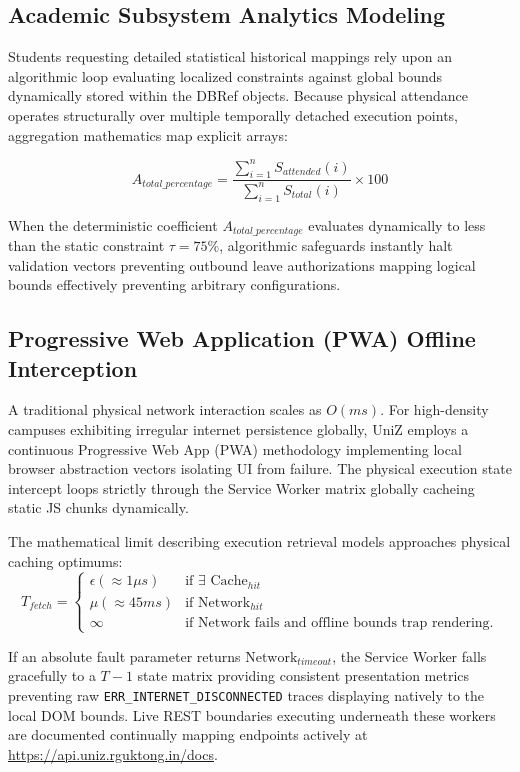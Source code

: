 \documentclass[journal,onecolumn,10pt,draftclsnofoot]{IEEEtran}
\begin{document}
\subsection{Academic Subsystem Analytics Modeling}
Students requesting detailed statistical historical mappings rely upon an algorithmic loop evaluating localized constraints against global bounds dynamically stored within the DBRef objects. Because physical attendance operates structurally over multiple temporally detached execution points, aggregation mathematics map explicit arrays:

\begin{equation}
    A_{total\_percentage} = \frac{\sum_{i=1}^{n} S_{attended}(i)}{\sum_{i=1}^{n} S_{total}(i)} \times 100
\end{equation}

When the deterministic coefficient $A_{total\_percentage}$ evaluates dynamically to less than the static constraint $\tau = 75\%$, algorithmic safeguards instantly halt validation vectors preventing outbound leave authorizations mapping logical bounds effectively preventing arbitrary configurations.

\subsection{Progressive Web Application (PWA) Offline Interception}
A traditional physical network interaction scales as $O(ms)$. For high-density campuses exhibiting irregular internet persistence globally, UniZ employs a continuous Progressive Web App (PWA) methodology implementing local browser abstraction vectors isolating UI from failure. The physical execution state intercept loops strictly through the Service Worker matrix globally cacheing static JS chunks dynamically.

The mathematical limit describing execution retrieval models approaches physical caching optimums:
\begin{equation}
    T_{fetch} = 
    \begin{cases} 
      \epsilon (\approx 1 \mu s) & \text{if } \exists \text{ Cache}_{hit} \\
      \mu (\approx 45 ms) & \text{if } \text{Network}_{hit} \\
      \infty & \text{if Network fails and offline bounds trap rendering.}
    \end{cases}
\end{equation}

If an absolute fault parameter returns $\text{Network}_{timeout}$, the Service Worker falls gracefully to a $T-1$ state matrix providing consistent presentation metrics preventing raw \texttt{ERR\_INTERNET\_DISCONNECTED} traces displaying natively to the local DOM bounds. Live REST boundaries executing underneath these workers are documented continually mapping endpoints actively at \url{https://api.uniz.rguktong.in/docs}.
\end{document}
